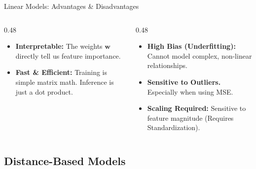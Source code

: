 \begin{frame}{Linear Models: Advantages \& Disadvantages}
    \begin{columns}[T]
        \begin{column}{0.48\textwidth}
            \begin{tcolorbox}[colback=green!5, title=Advantages]
                \begin{itemize}
                    \item \textbf{Interpretable:} The weights $\mathbf{w}$ directly tell us feature importance.
                    \item \textbf{Fast \& Efficient:} Training is simple matrix math. Inference is just a dot product.
                \end{itemize}
            \end{tcolorbox}
        \end{column}

        \begin{column}{0.48\textwidth}
            \begin{tcolorbox}[colback=red!5, title=Disadvantages]
                \begin{itemize}
                    \item \textbf{High Bias (Underfitting):} Cannot model complex, non-linear relationships.
                    \item \textbf{Sensitive to Outliers.} Especially when using MSE.
                    \item \textbf{Scaling Required:} Sensitive to feature magnitude (Requires Standardization).
                \end{itemize}
            \end{tcolorbox}
        \end{column}
    \end{columns}

\end{frame}




\subsection{Distance-Based Models}

